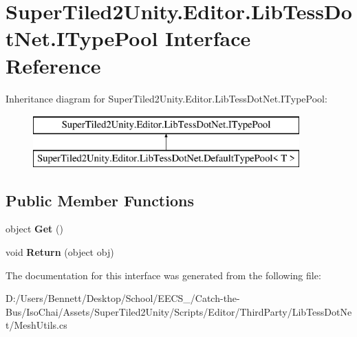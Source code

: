 \hypertarget{interface_super_tiled2_unity_1_1_editor_1_1_lib_tess_dot_net_1_1_i_type_pool}{}\section{Super\+Tiled2\+Unity.\+Editor.\+Lib\+Tess\+Dot\+Net.\+I\+Type\+Pool Interface Reference}
\label{interface_super_tiled2_unity_1_1_editor_1_1_lib_tess_dot_net_1_1_i_type_pool}
Inheritance diagram for Super\+Tiled2\+Unity.\+Editor.\+Lib\+Tess\+Dot\+Net.\+I\+Type\+Pool\+:\begin{figure}[H]
\begin{center}
\leavevmode
\includegraphics[height=2.000000cm]{interface_super_tiled2_unity_1_1_editor_1_1_lib_tess_dot_net_1_1_i_type_pool}
\end{center}
\end{figure}
\subsection*{Public Member Functions}
\begin{DoxyCompactItemize}
\item 
\mbox{\label{interface_super_tiled2_unity_1_1_editor_1_1_lib_tess_dot_net_1_1_i_type_pool_a9c57da7865b72609742c0d0dccf68b8f}} 
object {\bfseries Get} ()
\item 
\mbox{\label{interface_super_tiled2_unity_1_1_editor_1_1_lib_tess_dot_net_1_1_i_type_pool_a51f31b509e56744e7dc19ef0d92c6e1f}} 
void {\bfseries Return} (object obj)
\end{DoxyCompactItemize}


The documentation for this interface was generated from the following file\+:\begin{DoxyCompactItemize}
\item 
D\+:/\+Users/\+Bennett/\+Desktop/\+School/\+E\+E\+C\+S\+\_/\+Catch-\/the-\/\+Bus/\+Iso\+Chai/\+Assets/\+Super\+Tiled2\+Unity/\+Scripts/\+Editor/\+Third\+Party/\+Lib\+Tess\+Dot\+Net/Mesh\+Utils.\+cs\end{DoxyCompactItemize}
